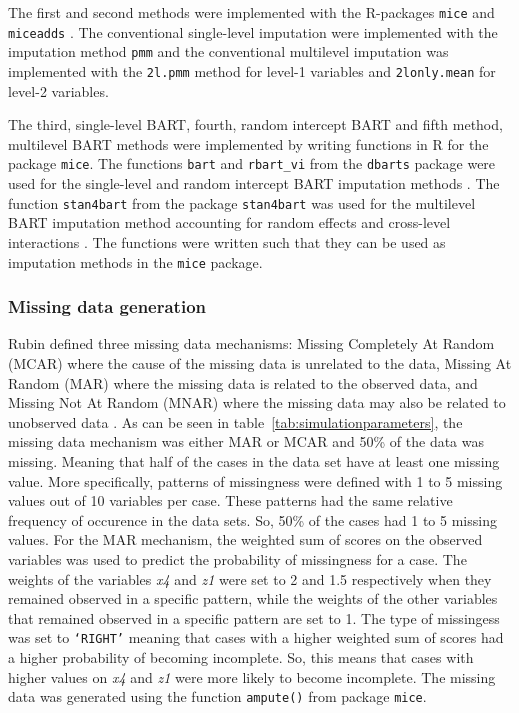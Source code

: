 \documentclass[10pt, a4paper, titlepage]{article}
\begin{document}
The first and second methods were implemented with the R-packages \texttt{mice} and \texttt{miceadds} \citep{robitzsch2024}. The conventional single-level imputation were implemented with the imputation method \texttt{pmm} and the conventional multilevel imputation was implemented with the \texttt{2l.pmm} method for level-1 variables and \texttt{2lonly.mean} for level-2 variables.

The third, single-level BART, fourth, random intercept BART and fifth method, multilevel BART methods were implemented by writing functions in R \citep{rcoreteam2023} for the package \texttt{mice}. The functions \texttt{bart} and \texttt{rbart\_vi} from the \texttt{dbarts} package were used for the single-level and random intercept BART imputation methods \citep{dorie2024}. The function \texttt{stan4bart} from the package \texttt{stan4bart} was used for the multilevel BART imputation method accounting for random effects and cross-level interactions \citep{dorie2023a}. The functions were written such that they can be used as imputation methods in the \texttt{mice} package.

\subsubsection{Missing data generation}
Rubin defined three missing data mechanisms: Missing Completely At Random (MCAR) where the cause of the missing data is unrelated to the data, Missing At Random (MAR) where the missing data is related to the observed data, and Missing Not At Random (MNAR) where the missing data may also be related to unobserved data \citep{rubin1976}. As can be seen in table~\ref{tab:simulationparameters}, the missing data mechanism was either MAR or MCAR and 50\% of the data was missing. Meaning that half of the cases in the data set have at least one missing value. More specifically, patterns of missingness were defined with 1 to 5 missing values out of 10 variables per case. These patterns had the same relative frequency of occurence in the data sets. So, 50\% of the cases had 1 to 5 missing values. For the MAR mechanism, the weighted sum of scores on the observed variables was used to predict the probability of missingness for a case. The weights of the variables \textit{x4} and \textit{z1} were set to 2 and 1.5 respectively when they remained observed in a specific pattern, while the weights of the other variables that remained observed in a specific pattern are set to 1. The type of missingess was set to \texttt{`RIGHT'} meaning that cases with a higher weighted sum of scores had a higher probability of becoming incomplete. So, this means that cases with higher values on \textit{x4} and \textit{z1} were more likely to become incomplete. The missing data was generated using the function \texttt{ampute()} from package \texttt{mice}.
\end{document}
